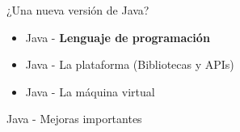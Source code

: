 \documentclass[aspectratio=169]{beamer}
\begin{document}

\begin{frame}[fragile]{¿Una nueva versión de Java?}
	\begin{itemize}
		\item Java - \textbf{Lenguaje de programación}
		\item Java - La plataforma (Bibliotecas y APIs)
		\item Java - La máquina virtual
	\end{itemize}	
\end{frame}



\begin{frame}[fragile]{Java - Mejoras importantes}
	\begin{columns}[T] %
		

\end{columns}
\end{frame}
\end{document}
